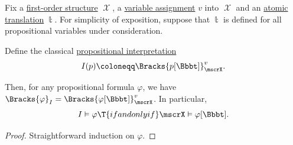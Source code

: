 \begin{proposition}\label{thm:fol_propositional_formula_translation_semantics}
  Fix a \hyperref[def:fol_structure]{first-order structure} \( \mscrX \), a \hyperref[def:fol_variable_assignment]{variable assignment} \( v \) into \( \mscrX \) and an \hyperref[def:atomic_fol_propositional_formula_translation]{atomic translation} \( \Bbbt \). For simplicity of exposition, suppose that \( \Bbbt \) is defined for all propositional variables under consideration.

  Define the classical \hyperref[def:propositional_interpretation]{propositional interpretation}
  \begin{equation}\label{eq:thm:fol_propositional_formula_translation_semantics/compatibility}
    I(p) \coloneqq \Bracks{p[\Bbbt]}_\mscrX^v.
  \end{equation}

  Then, for any propositional formula \( \varphi \), we have \( \Bracks{\varphi}_I = \Bracks{\varphi[\Bbbt]}_\mscrX^v \). In particular,
  \begin{equation*}
    I \vDash \varphi \T{if and only if} \mscrX \vDash \varphi[\Bbbt].
  \end{equation*}
\end{proposition}
\begin{proof}
  Straightforward induction on \( \varphi \).
\end{proof}

